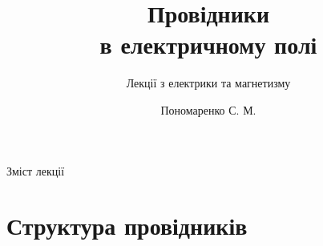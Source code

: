 \documentclass{beamer}
\title[Лекції електрики та магнетизму]{\huge\bfseries Провідники \\ в електричному полі}
\subtitle{Лекції з електрики та магнетизму}
\author{Пономаренко С. М.}
\date{}
\begin{document}
\begin{frame}[plain]
	\maketitle
\end{frame}

\begin{frame}{Зміст лекції}{}
       \tableofcontents
\end{frame}

\section{Структура провідників}
\end{document}
